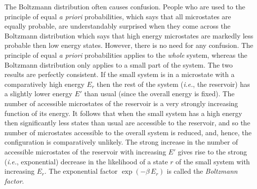 The Boltzmann distribution often causes confusion. People who are used to the
principle of equal {\em a priori}\/ probabilities, which says that all microstates
are equally probable, are understandably surprised when they come across the
Boltzmann distribution which says that high energy microstates are markedly less
probable then low energy states. However, there is  no need for any
confusion. The principle of equal {\em a priori}\/ probabilities applies to
the {\em whole}\/ system, whereas the Boltzmann distribution only applies to
a small part of the system. The two results are perfectly consistent. 
If the small system is in a microstate with a comparatively high energy $E_r$ then 
the rest of the system ({\em i.e.}, the reservoir) has a slightly lower energy $E'$ than
usual (since the overall energy is fixed). The number of accessible microstates
of the reservoir is a very strongly increasing function of its energy. It
follows that when the small system has a 
high energy then significantly less states 
than usual are accessible to the reservoir,  and so  the number of microstates
 accessible
to the overall system is reduced, and, hence, the configuration is comparatively
unlikely. The strong increase in the number of accessible microstates of the
reservoir with  increasing $E'$  gives rise to the strong ({\em i.e.}, exponential) decrease
in the likelihood of a state $r$ of the small system with increasing $E_r$. 
The exponential factor $\exp(-\beta \,E_r)$ is called the {\em Boltzmann factor}.

